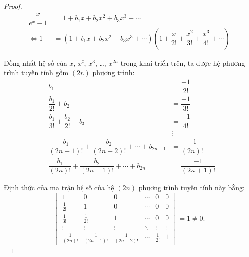 \documentclass[class=nhvh-linear-algebra,crop=false]{standalone}
\begin{document}
\begin{proof}
    \begingroup{}
    \allowdisplaybreaks{}
    \begin{align*}
        \dfrac{x}{e^{x}-1} & = 1 + b_{1}x + b_{2}x^{2} + b_{3}x^{3} + \cdots                                                                                  \\
        \Leftrightarrow 1  & = (1 + b_{1}x + b_{2}x^{2} + b_{3}x^{3} + \cdots)\left(1 + \dfrac{x}{2!} + \dfrac{x^{2}}{3!} + \dfrac{x^{3}}{4!} + \cdots\right)
    \end{align*}
    \endgroup{}
    \par Đồng nhất hệ số của $x$, $x^{2}$, $x^{3}$, \ldots, $x^{2n}$ trong khai triển trên, ta được hệ phương trình tuyến tính gồm $(2n)$ phương trình:
    \begin{align*}
         & b_{1}                                                               & = \dfrac{-1}{2!}      \\
         & \dfrac{b_{1}}{2!} + b_{2}                                           & = \dfrac{-1}{3!}      \\
         & \dfrac{b_{1}}{3!} + \dfrac{b_{2}}{2!} + b_{3}                       & = \dfrac{-1}{4!}      \\
         &                                                                     & \vdots                \\
         & \dfrac{b_{1}}{(2n-1)!} + \dfrac{b_{2}}{(2n-2)!} + \cdots + b_{2n-1} & = \dfrac{-1}{(2n)!}   \\
         & \dfrac{b_{1}}{(2n)!} + \dfrac{b_{2}}{(2n-1)!} + \cdots + b_{2n}     & = \dfrac{-1}{(2n+1)!}
    \end{align*}
    \par Định thức của ma trận hệ số của hệ $(2n)$ phương trình tuyến tính này bằng:
    \[
        \begin{vmatrix}
            1               & 0                 & 0                 & \cdots & 0            & 0      \\
            \frac{1}{2!}    & 1                 & 0                 & \cdots & 0            & 0      \\
            \frac{1}{3!}    & \frac{1}{2!}      & 1                 & \cdots & 0            & 0      \\
            \vdots          & \vdots            & \vdots            & \ddots & \vdots       & \vdots \\
            \frac{1}{(2n)!} & \frac{1}{(2n-1)!} & \frac{1}{(2n-2)!} & \cdots & \frac{1}{2!} & 1
        \end{vmatrix} = 1 \ne 0.
\]
\end{proof}
\end{document}
